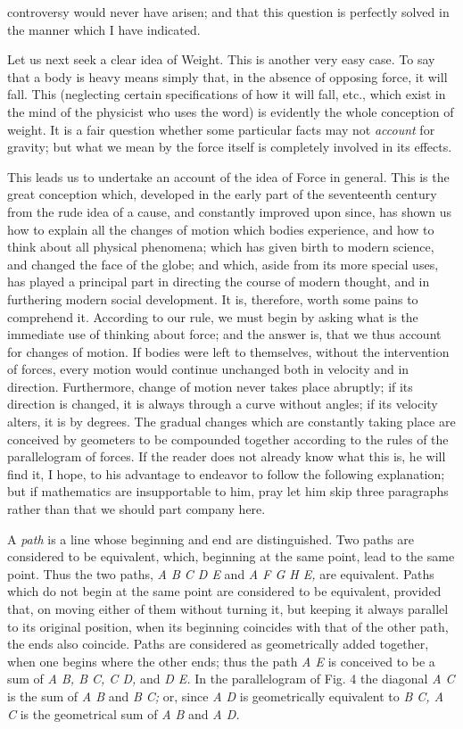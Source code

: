 \documentclass[]{article}
\begin{document}
controversy would never have arisen; and that this question is perfectly solved in the manner which I have indicated. 


Let us next seek a clear idea of Weight. This is another very easy case. To say that a body is heavy means simply that, in the absence of opposing force, it will fall. This (neglecting certain specifications of how it will fall, etc., which exist in the mind of the physicist who uses the word) is evidently the whole conception of weight. It is a fair question whether some particular facts may not \emph{account} for gravity;  but what we mean by the force itself is completely involved in its effects.
 
This leads us to undertake an account of the idea of Force in general. This is the great conception which, developed in the early part of the seventeenth century from the rude idea of a cause, and constantly improved upon since, has shown us how to explain all the changes of motion which bodies experience, and how to think about all physical phenomena; which has given birth to modern science, and changed the face of the globe; and which, aside from its more special uses, has played a principal part in directing the course of modern thought, and in furthering modern social development. It is, therefore, worth some pains to comprehend it. According to our rule, we must begin by asking what is the immediate use of thinking about force; and the answer is, that we thus account for changes of motion. If bodies were left to themselves, without the intervention of forces, every motion would continue unchanged both in velocity and in direction. Furthermore, change of motion never takes place abruptly; if its direction is changed, it is always through a curve without angles; if its velocity alters, it is by degrees. The gradual changes which are constantly taking place are conceived by geometers to be compounded together according to the rules of the parallelogram of forces. If the reader does not already know what this is, he will find it, I hope, to his advantage to endeavor to follow the following explanation; but if mathematics are insupportable to him, pray let him skip three paragraphs rather than that we should part company here.


A \emph{path} is a line whose beginning and end are distinguished. Two paths are considered to be equivalent, which, beginning at the same point, lead to the same point. Thus the two paths, \emph{A B C D E} and \emph{A F G H E,} are equivalent. Paths which do not begin at the same point are considered to be equivalent, provided that, on moving either of them without turning it, but keeping it always parallel to its original position, when its beginning coincides with that of the other path, the ends also coincide. Paths are considered as geometrically added together, when one begins where the other ends; thus the path \emph{A E} is conceived to be a sum of \emph{A B, B C, C D,} and \emph{D E.} In the parallelogram of Fig. 4 the diagonal \emph{A C} is the sum of \emph{A B} and \emph{B C;} or, since \emph{A D} is geometrically equivalent to \emph{B C, A C} is the geometrical sum of \emph{A B} and \emph{A D.}
\end{document}
